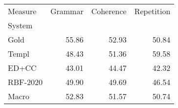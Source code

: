 \begin{tabular}{lrrr}
\toprule
Measure & Grammar & Coherence & Repetition \\
System &  &  &  \\
\midrule
Gold & 55.86 & 52.93 & 50.84 \\
Templ & 48.43 & 51.36 & 59.58 \\
ED+CC & 43.01 & 44.47 & 42.32 \\
RBF-2020 & 49.90 & 49.69 & 46.54 \\
Macro & 52.83 & 51.57 & 50.74 \\
\bottomrule
\end{tabular}
